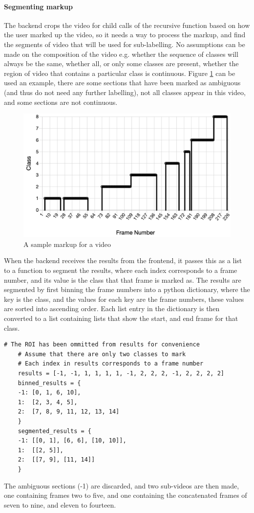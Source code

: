     \paragraph{Segmenting markup}
    The backend crops the video for child calls of the recursive function based on how the user marked up the video, so it needs a way to process the markup, and find the segments of video that will be used for sub-labelling. No assumptions can be made on the composition of the video e.g. whether the sequence of classes will always be the same, whether all, or only some classes are present, whether the region of video that contains a particular class is continuous. Figure \ref{fig:labelsample} can be used an example, there are some sections that have been marked as ambiguous (and thus do not need any further labelling), not all classes appear in this video, and some sections are not continuous.

    \begin{figure}[h]
        \centering
        \includegraphics[width=450px]{../img/sample_label.png}
        \caption{A sample markup for a video}
        \label{fig:labelsample}
    \end{figure}

    When the backend receives the results from the frontend, it passes this as a list to a function to segment the results, where each index corresponds to a frame number, and its value is the class that that frame is marked as. The results are segmented by first binning the frame numbers into a python dictionary, where the key is the class, and the values for each key are the frame numbers, these values are sorted into ascending order. Each list entry in the dictionary is then converted to a list containing lists that show the start, and end frame for that class.
    \begin{lstlisting}[style=PythonStyle]
    # The ROI has been ommitted from results for convenience
    # Assume that there are only two classes to mark
    # Each index in results corresponds to a frame number
    results = [-1, -1, 1, 1, 1, 1, -1, 2, 2, 2, -1, 2, 2, 2, 2]
    binned_results = {
    -1: [0, 1, 6, 10],
    1:  [2, 3, 4, 5],
    2:  [7, 8, 9, 11, 12, 13, 14]
    }
    segmented_results = {
    -1: [[0, 1], [6, 6], [10, 10]],
    1:  [[2, 5]],
    2:  [[7, 9], [11, 14]]
    }\end{lstlisting}
    The ambiguous sections (-1) are discarded, and two sub-videos are then made, one containing frames two to five, and one containing the concatenated frames of seven to nine, and eleven to fourteen.

